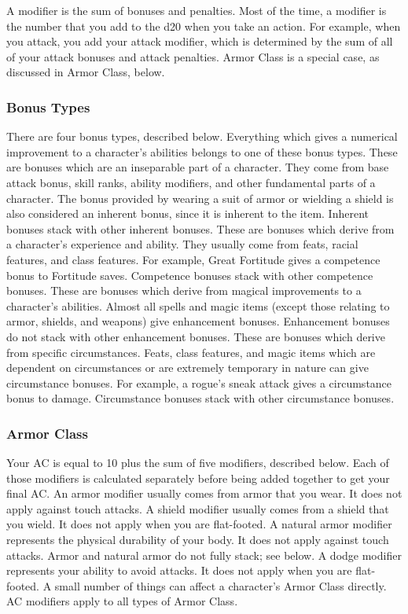 A modifier is the sum of bonuses and penalties. Most of the time, a modifier is the number that you add to the d20 when you take an action. For example, when you attack, you add your attack modifier, which is determined by the sum of all of your attack bonuses and attack penalties. Armor Class is a special case, as discussed in Armor Class, below.

\subsubsection{Bonus Types}
There are four bonus types, described below. Everything which gives a numerical improvement to a character's abilities belongs to one of these bonus types.
 These are bonuses which are an inseparable part of a character. They come from base attack bonus, skill ranks, ability modifiers, and other fundamental parts of a character. The bonus provided by wearing a suit of armor or wielding a shield is also considered an inherent bonus, since it is inherent to the item. Inherent bonuses stack with other inherent bonuses.
 These are bonuses which derive from a character's experience and ability. They usually come from feats, racial features, and class features. For example, Great Fortitude gives a competence bonus to Fortitude saves. Competence bonuses stack with other competence bonuses.
 These are bonuses which derive from magical improvements to a character's abilities. Almost all spells and magic items (except those relating to armor, shields, and weapons) give enhancement bonuses. Enhancement bonuses do not stack with other enhancement bonuses.
 These are bonuses which derive from specific circumstances. Feats, class features, and magic items which are dependent on circumstances or are extremely temporary in nature can give circumstance bonuses. For example, a rogue's sneak attack gives a circumstance bonus to damage. Circumstance bonuses stack with other circumstance bonuses.

\subsubsection{Armor Class}
Your AC is equal to 10 plus the sum of five modifiers, described below. Each of those modifiers is calculated separately before being added together to get your final AC. 
 An armor modifier usually comes from armor that you wear. It does not apply against touch attacks.
 A shield modifier usually comes from a shield that you wield. It does not apply when you are flat-footed.
 A natural armor modifier represents the physical durability of your body. It does not apply against touch attacks. Armor and natural armor do not fully stack; see below.
 A dodge modifier represents your ability to avoid attacks. It does not apply when you are flat-footed.
 A small number of things can affect a character's Armor Class directly. AC modifiers apply to all types of Armor Class.

